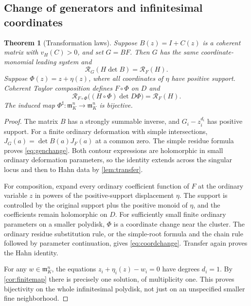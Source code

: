\documentclass[11pt,letterpaper]{article}
\newtheorem{theorem}{Theorem}[section]
\theoremstyle{definition}
\theoremstyle{remark}
\newcommand{\mm}{\mathfrak m}
\newcommand{\RR}{\mathscr R}
\newcommand{\sh}{^{\sharp}}
\numberwithin{equation}{section}
\begin{document}
\subsection{Change of generators and infinitesimal coordinates}
\begin{theorem}[Transformation laws]\label{thm:transform}
Suppose $B(z)=I+C(z)$ is a coherent matrix with $v_H(C)>0$, and set $G=BF$. Then $G$ has the same coordinate-monomial leading system and
\begin{equation}\label{eq:genchange}
 \RR_G(H\det B)=\RR_F(H).
\end{equation}
Suppose $\Phi(z)=z+\eta(z)$, where all coordinates of $\eta$ have positive support. Coherent Taylor composition defines $F\circ\Phi$ on $D$ and
\begin{equation}\label{eq:coordchange}
 \RR_{F\circ\Phi}\bigl((H\circ\Phi)\det D\Phi\bigr)=\RR_F(H).
\end{equation}
The induced map $\Phi\sh:\mm_K^n\to\mm_K^n$ is bijective.
\end{theorem}
\begin{proof}
The matrix $B$ has a strongly summable inverse, and $G_i-z_i^{d_i}$ has positive support. For a finite ordinary deformation with simple intersections, $J_G(a)=\det B(a)J_F(a)$ at a common zero. The simple residue formula proves \eqref{eq:genchange}. Both contour expressions are holomorphic in small ordinary deformation parameters, so the identity extends across the singular locus and then to Hahn data by \cref{lem:transfer}.

For composition, expand every ordinary coefficient function of $F$ at the ordinary variable $z$ in powers of the positive-support displacement $\eta$. The support is controlled by the original support plus the positive monoid of $\eta$, and the coefficients remain holomorphic on $D$. For sufficiently small finite ordinary parameters on a smaller polydisk, $\Phi$ is a coordinate change near the cluster. The ordinary residue substitution rule, or the simple-root formula and the chain rule followed by parameter continuation, gives \eqref{eq:coordchange}. Transfer again proves the Hahn identity.

For any $w\in\mm_K^n$, the equations $z_i+\eta_i(z)-w_i=0$ have degrees $d_i=1$. By \cref{cor:finitemap} there is precisely one solution, of multiplicity one. This proves bijectivity on the whole infinitesimal polydisk, not just on an unspecified smaller fine neighborhood.
\end{proof}
\end{document}
